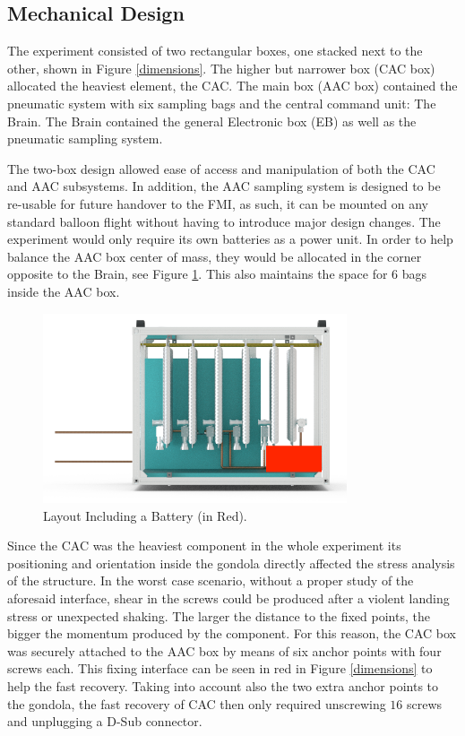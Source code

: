 \pagebreak
\subsection{Mechanical Design} \label{Mechanical_Design}
\label{sec:mechanical-design}

The experiment consisted of two rectangular boxes, one stacked next to the other, shown in Figure \ref{dimensions}. The higher but narrower box (CAC box) allocated the heaviest element, the CAC. The main box (AAC box) contained the pneumatic system with six sampling bags and the central command unit: The Brain. The Brain contained the general Electronic box (EB) as well as the pneumatic sampling system.

The two-box design allowed ease of access and manipulation of both the CAC and AAC subsystems. In addition, the AAC sampling system is designed to be re-usable for future handover to the FMI, as such, it can be mounted on any standard balloon flight without having to introduce major design changes. The experiment would only require its own batteries as a power unit. In order to help balance the AAC box center of mass, they would be allocated in the corner opposite to the Brain, see Figure \ref{battery_distribution}. This also maintains the space for 6 bags inside the AAC box.

\begin{figure}[H]
    \centering
    \includegraphics[width=0.8\textwidth]{4-experiment-design/img/Mechanical/Figure_15.png}
    \caption{Layout Including a Battery (in Red).}
    \label{battery_distribution}
\end{figure}

\pagebreak
Since the CAC was the heaviest component in the whole experiment its positioning and orientation inside the gondola directly affected the stress analysis of the structure. In the worst case scenario, without a proper study of the aforesaid interface, shear in the screws could be produced after a violent landing stress or unexpected shaking. The larger the distance to the fixed points, the bigger the momentum produced by the component. For this reason, the CAC box was securely attached to the AAC box by means of six anchor points with four screws each. This fixing interface can be seen in red in Figure \ref{dimensions} to help the fast recovery. Taking into account also the two extra anchor points to the gondola, the fast recovery of CAC then only required unscrewing $16$ screws and unplugging a D-Sub connector.

